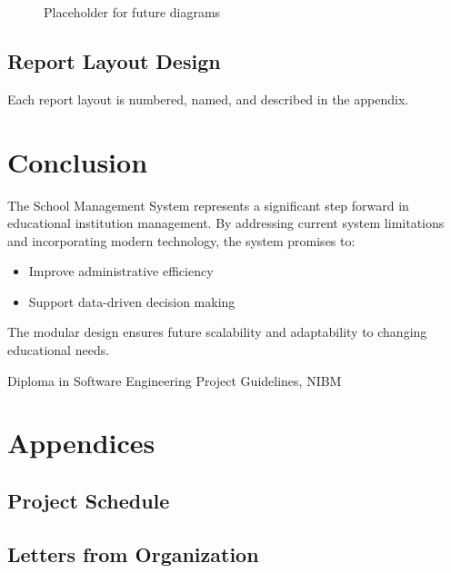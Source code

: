 \documentclass[12pt,a4paper]{report}
\begin{document}
\begin{figure}[htbp]
    \centering
    \caption{Placeholder for future diagrams}
\end{figure}

\section{Report Layout Design}
Each report layout is numbered, named, and described in the appendix.

\chapter{Conclusion}
The School Management System represents a significant step forward in educational institution management. By addressing current system limitations and incorporating modern technology, the system promises to:
\begin{itemize}
    \item Improve administrative efficiency
    \item Support data-driven decision making
\end{itemize}

The modular design ensures future scalability and adaptability to changing educational needs.

\newpage
\begin{thebibliography}{9}
     Diploma in Software Engineering Project Guidelines, NIBM
\end{thebibliography}

\appendix
\chapter{Appendices}
\section{Project Schedule}

\section{Letters from Organization}
\end{document}
